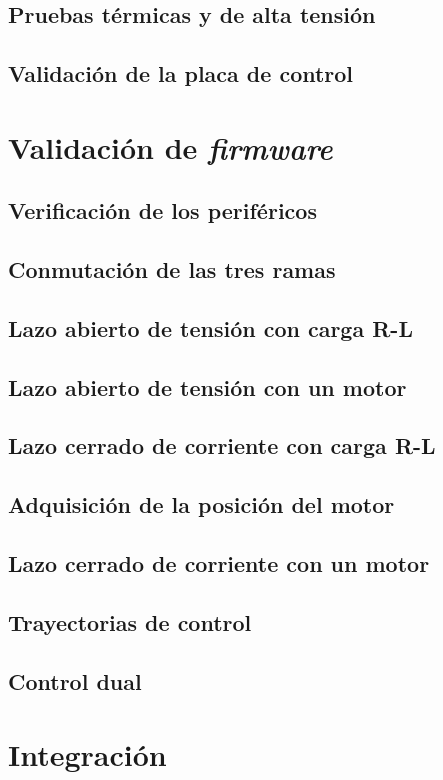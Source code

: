 \subsection{Pruebas térmicas y de alta tensión}

\subsection{Validación de la placa de control}


\section{Validación de \textit{firmware}}
\subsection{Verificación de los periféricos}

\subsection{Conmutación de las tres ramas}

\subsection{Lazo abierto de tensión con carga R-L}

\subsection{Lazo abierto de tensión con un motor}

\subsection{Lazo cerrado de corriente con carga R-L}

\subsection{Adquisición de la posición del motor}

\subsection{Lazo cerrado de corriente con un motor}

\subsection{Trayectorias de control}

\subsection{Control dual}

\section{Integración}
